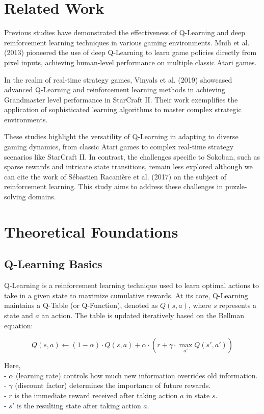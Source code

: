 \documentclass[10pt,twocolumn]{article}
\begin{document}
\section{Related Work}

Previous studies have demonstrated the effectiveness of Q-Learning and deep reinforcement learning techniques in various gaming environments. Mnih et al. (2013) \cite{mnih2013playing} pioneered the use of deep Q-Learning to learn game policies directly from pixel inputs, achieving human-level performance on multiple classic Atari games.

In the realm of real-time strategy games, Vinyals et al. (2019) \cite{vinyals2019grandmaster} showcased advanced Q-Learning and reinforcement learning methods in achieving Grandmaster level performance in StarCraft II. Their work exemplifies the application of sophisticated learning algorithms to master complex strategic environments.

These studies highlight the versatility of Q-Learning in adapting to diverse gaming dynamics, from classic Atari games to complex real-time strategy scenarios like StarCraft II. In contrast, the challenges specific to Sokoban, such as sparse rewards and intricate state transitions, remain less explored although we can cite the work of Sébastien Racanière et al. (2017) \cite{racaniere2017imagination} on the subject of reinforcement learning. This study aims to address these challenges in puzzle-solving domains.

\section{Theoretical Foundations}

\subsection{Q-Learning Basics}

Q-Learning is a reinforcement learning technique used to learn optimal actions to take in a given state to maximize cumulative rewards. At its core, Q-Learning maintains a Q-Table (or Q-Function), denoted as \( Q(s, a) \), where \( s \) represents a state and \( a \) an action. The table is updated iteratively based on the Bellman equation:

\[
    Q(s, a) \leftarrow (1 - \alpha) \cdot Q(s, a) + \alpha \cdot \left( r + \gamma \cdot \max_{a'} Q(s', a') \right)
\]

Here, \\
- \( \alpha \) (learning rate) controls how much new information overrides old information. \\
- \( \gamma \) (discount factor) determines the importance of future rewards. \\
- \( r \) is the immediate reward received after taking action \( a \) in state \( s \). \\
- \( s' \) is the resulting state after taking action \( a \). \\
\end{document}
